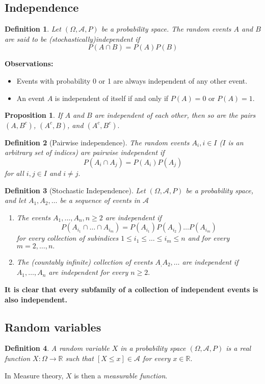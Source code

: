 \documentclass[12pt]{report} \addtolength{\textheight}{2in}
\newtheorem{defn}{Definition}
\newtheorem{prop}{Proposition}
\newcommand{\Realnum}{\mathbb{R}}
\newcommand{\bigA}{\mathcal{A}}
\newcommand{\probsp}{(\Omega, \bigA, P)}
\begin{document}
\subsection*{Independence}
\begin{defn}
Let $\probsp$ be a probability space. The random events $A$ and $B$ are said to be (stochastically)\textit{independent} if
\begin{displaymath}
P(A\cap B) = P(A)P(B)
\end{displaymath} 
\end{defn}
\textbf{Observations:}
\begin{itemize}
\item Events with probability 0 or 1 are always independent of any other event.
\item An event $A$ is independent of itself if and only if $P(A)= 0$ or $P(A)=1.$ 
\end{itemize}
\begin{prop}
If $A$ and $B$ are independent of each other, then so are the pairs $(A, B^c)$, $(A^c,B)$, and $(A^c,B^c).$
\end{prop}
\begin{defn}[Pairwise independence]
The random events $A_i, i \in I$ ($I$ is an arbitrary set of indices) are pairwise independent if 
\begin{displaymath}
P(A_i\cap A_j) = P(A_i)P(A_j)
\end{displaymath} 
for all $i,j \in I$ and $i \not= j.$
\end{defn}
\begin{defn}[Stochastic Independence] Let $\probsp$ be a probability space, and let $A_1,A_2,\dots$ be a sequence of events in $\bigA$
\begin{enumerate}
\item[a)] The events $A_1,\dots, A_n, n\geq 2$ are independent if 
\begin{displaymath}
P(A_{i_1}\cap \dots \cap A_{i_m})=P(A_{i_1})P(A_{i_{2}})\dots P(A_{i_{m}})
\end{displaymath}
for every collection of subindices $1\leq i_1\leq \dots \leq i_{m} \leq n$ and for every $m=2,\dots,n.$
\item[b)] The (countably infinite) collection of events $A_,A_2,\dots$ are independent if $A_1,\dots,A_n$ are independent for every $n \geq 2.$
\end{enumerate}
\end{defn}
\textbf{It is clear that every subfamily of a collection of independent events is also independent.}
\newpage
\subsection*{Random variables}
\begin{defn}
A random variable $X$ in a probability space $\probsp$ is a real function $X: \Omega \to \Realnum$ such that $[X \leq x] \in \bigA$ for every $x \in \Realnum.$ \end{defn}
In Measure theory, $X$ is then a \textit{measurable function}.
\end{document}
